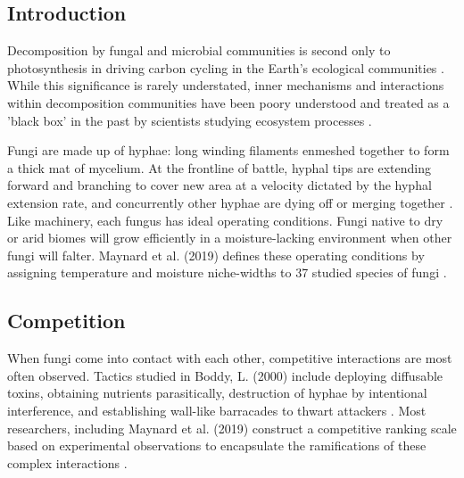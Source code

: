 \documentclass[12pt]{article}
\begin{document}
\clearpage
\begin{multicols}{2}
\tableofcontents
\listoftables
\newpage
\pagestyle{fancy}
\newpage
\setcounter{page}{1}


	
	
\section{Introduction}

Decomposition by fungal and microbial communities is second only to photosynthesis in driving carbon cycling in the Earth's ecological communities \cite{McGuire2010}. While this significance is rarely understated, inner mechanisms and interactions within decomposition communities have been poory understood and treated as a 'black box' in the past by scientists studying ecosystem processes \cite{Andren1999}.

Fungi are made up of hyphae: long winding filaments enmeshed together to form a thick mat of mycelium. At the frontline of battle, hyphal tips are extending forward and branching to cover new area at a velocity dictated by the hyphal extension rate, and concurrently other hyphae are dying off or merging together \cite{Edelstein1982}. Like machinery, each fungus has ideal operating conditions. Fungi native to dry or arid biomes will grow efficiently in a moisture-lacking environment when other fungi will falter. Maynard et al. (2019) defines these operating conditions by assigning temperature and moisture niche-widths to 37 studied species of fungi \cite{Maynard2019}.

\subsection{Competition}
When fungi come into contact with each other, competitive interactions are most often observed. Tactics studied in Boddy, L. (2000) include deploying diffusable toxins, obtaining nutrients parasitically, destruction of hyphae by intentional interference, and establishing wall-like barracades to thwart attackers \cite{Boddy2000}. Most researchers, including Maynard et al. (2019) construct a competitive ranking scale based on experimental observations to encapsulate the ramifications of these complex interactions \cite{Maynard2019}.


\end{multicols}
\end{document}
